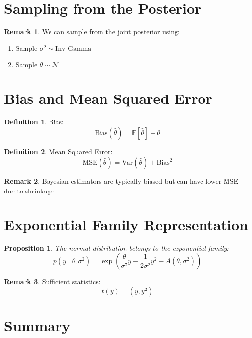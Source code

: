 \documentclass[12pt,oneside]{book}
\numberwithin{equation}{section}
\theoremstyle{definition}
\newtheorem{definition}{Definition}[section]
\newtheorem{remark}{Remark}[section]
\theoremstyle{plain}
\newtheorem{proposition}{Proposition}[section]
\theoremstyle{remark}
\newcommand{\E}{\mathbb{E}}
\newcommand{\Var}{\mathrm{Var}}
\newcommand{\Normal}{\mathcal{N}}
\newcommand{\InvGam}{\mathrm{Inv\text{-}Gamma}}
\begin{document}
\section{Sampling from the Posterior}

\begin{remark}
We can sample from the joint posterior using:
\begin{enumerate}
\item Sample $\sigma^2 \sim \InvGam$
\item Sample $\theta \sim \Normal$
\end{enumerate}
\end{remark}

\section{Bias and Mean Squared Error}

\begin{definition}
Bias:
$$
\text{Bias}(\hat{\theta}) = \E[\hat{\theta}] - \theta
$$
\end{definition}

\begin{definition}
Mean Squared Error:
$$
\text{MSE}(\hat{\theta})
=
\Var(\hat{\theta}) + \text{Bias}^2
$$
\end{definition}

\begin{remark}
Bayesian estimators are typically biased but can have lower MSE due to shrinkage.
\end{remark}

\section{Exponential Family Representation}

\begin{proposition}
The normal distribution belongs to the exponential family:
$$
p(y \mid \theta, \sigma^2)
=
\exp\left(
\frac{\theta}{\sigma^2}y
-
\frac{1}{2\sigma^2}y^2
- A(\theta,\sigma^2)
\right)
$$
\end{proposition}

\begin{remark}
Sufficient statistics:
$$
t(y) = (y, y^2)
$$
\end{remark}

\section{Summary}
\end{document}
